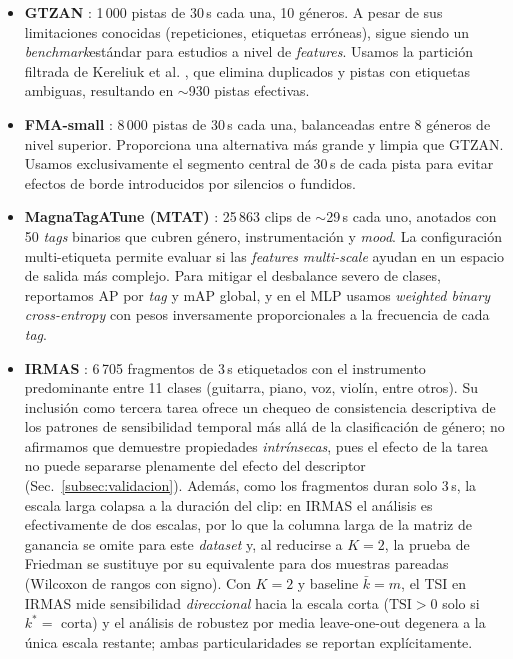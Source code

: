 \documentclass[conference]{IEEEtran}
\begin{document}
\begin{itemize}
    \item \textbf{GTZAN} \cite{tzanetakis2002musical}: 1\,000 pistas de 30\,s cada una, 10 géneros. A pesar de sus limitaciones conocidas (repeticiones, etiquetas erróneas), sigue siendo un \textit{benchmark}estándar para estudios a nivel de \textit{features}. Usamos la partición 
    filtrada de Kereliuk et al. \cite{kereliuk2015counterexample}, 
    que elimina duplicados y pistas con etiquetas ambiguas, resultando en $\sim$930 pistas efectivas.
    \item \textbf{FMA-small} \cite{defferrard2017fma}: 8\,000 pistas de 30\,s cada una, balanceadas entre 8 géneros de nivel superior. 
    Proporciona una alternativa más grande y limpia que GTZAN. Usamos exclusivamente el segmento central de 30\,s de cada pista para evitar efectos de borde introducidos por silencios o fundidos.
    \item \textbf{MagnaTagATune (MTAT)} \cite{law2009evaluation}: 25\,863 clips de $\sim$29\,s cada uno, anotados con 50 \textit{tags} binarios 
    que cubren género, instrumentación y \textit{mood}. La configuración multi-etiqueta permite evaluar si las \textit{features} \textit{multi-scale} ayudan en un espacio de salida más complejo. Para mitigar 
    el desbalance severo de clases, reportamos AP por \textit{tag} y mAP global, y en el MLP usamos \textit{weighted binary cross-entropy} con pesos inversamente proporcionales a la frecuencia de cada \textit{tag}.
    \item \textbf{IRMAS} \cite{bosch2012comparison}: 6\,705 fragmentos de 3\,s etiquetados con el instrumento predominante entre 11
    clases (guitarra, piano, voz, violín, entre otros). Su inclusión como tercera tarea ofrece un chequeo de consistencia descriptiva de los patrones de sensibilidad temporal más allá de la clasificación de género; no afirmamos que demuestre propiedades \emph{intrínsecas}, pues el efecto de la tarea no puede separarse plenamente del efecto del descriptor (Sec.~\ref{subsec:validacion}). Además, como los fragmentos duran solo 3\,s, la escala larga colapsa a la duración del clip: en IRMAS el análisis es efectivamente de dos escalas, por lo que la columna larga de la matriz de ganancia se omite para este \textit{dataset} y, al reducirse a $K=2$, la prueba de Friedman se sustituye por su equivalente para dos muestras pareadas (Wilcoxon de rangos con signo). Con $K=2$ y baseline $\bar k=m$, el TSI en IRMAS mide sensibilidad \emph{direccional} hacia la escala corta ($\mathrm{TSI}>0$ solo si $k^*=$ corta) y el análisis de robustez por media \mbox{leave-one-out} degenera a la única escala restante; ambas particularidades se reportan explícitamente.
\end{itemize}
\end{document}
